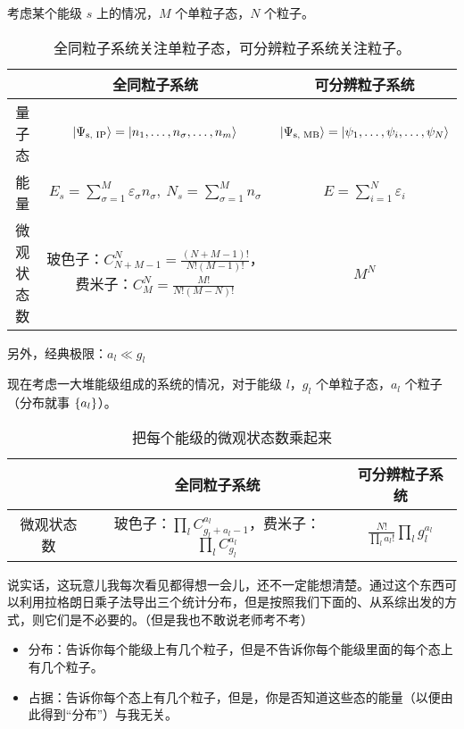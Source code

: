 考虑某个能级 $s$ 上的情况，$M$ 个单粒子态，$N$ 个粒子。
\begin{table}[H]
    \centering
    \begin{tabular}{|c|c|c|}
        \hline
              & 全同粒子系统                                                                                                     & 可分辨粒子系统                                                                    \\
        \hline
        量子态   & $\ket{\Psi_{\text{s, IP}}} = \ket{n_1, \dots, n_{\sigma}, \dots, n_m}$                                     & $\ket{\Psi_{\text{s, MB}}} = \ket{\psi_1, \dots, \psi_{i}, \dots, \psi_N}$ \\
        \hline
        能量    & $E_{s} = \sum_{\sigma = 1}^{M} \varepsilon_{\sigma} n_{\sigma},\ N_{s} = \sum_{\sigma = 1}^{M} n_{\sigma}$ & $E = \sum_{i = 1}^N \varepsilon_{i}$                                       \\
        \hline
        微观状态数 & 玻色子：$C_{N + M - 1}^{N} = \frac{(N + M - 1)!}{N! (M - 1)!}$，费米子：$C_{M}^{N} = \frac{M!}{N! (M - N)!}$        & $M^N$                                                                      \\
        \hline
    \end{tabular}
    \caption{全同粒子系统关注单粒子态，可分辨粒子系统关注粒子。}
\end{table}
另外，经典极限：$a_l \ll g_l$

现在考虑一大堆能级组成的系统的情况，对于能级 $l$，$g_l$ 个单粒子态，$a_l$ 个粒子（分布就事 $\qty{a_l}$）。
\begin{table}[H]
    \centering
    \begin{tabular}{|c|c|c|}
        \hline
              & 全同粒子系统                                                            & 可分辨粒子系统                                             \\
        \hline
        微观状态数 & 玻色子：$\prod_l C_{g_l + a_l - 1}^{a_l}$，费米子：$\prod_l C_{g_l}^{a_l}$ & $\frac{N!}{\prod_{l} a_l!} \prod_{l} g_{l}^{a_{l}}$ \\
        \hline
    \end{tabular}
    \caption{把每个能级的微观状态数乘起来}
\end{table}
说实话，这玩意儿我每次看见都得想一会儿，还不一定能想清楚。通过这个东西可以利用拉格朗日乘子法导出三个统计分布，但是按照我们下面的、从系综出发的方式，则它们是不必要的。（但是我也不敢说老师考不考）

\begin{itemize}
    \item 分布：告诉你每个能级上有几个粒子，但是不告诉你每个能级里面的每个态上有几个粒子。
    \item 占据：告诉你每个态上有几个粒子，但是，你是否知道这些态的能量（以便由此得到“分布”）与我无关。
\end{itemize}

